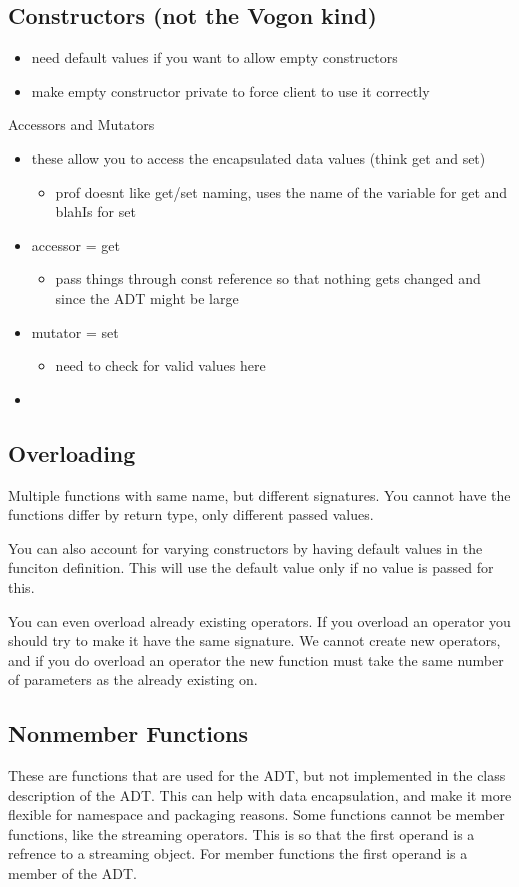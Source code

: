 \documentclass[12pt]{article}
\begin{document}
\subsection*{Constructors (not the Vogon kind)}
\begin{itemize}
\item need default values if you want to allow empty constructors
\item make empty constructor private to force client to use it correctly
\end{itemize}
Accessors and Mutators
\begin{itemize}
\item these allow you to access the encapsulated data values (think get and set)
\begin{itemize}
\item prof doesnt like get/set naming, uses the name of the variable for get and blahIs for set
\end{itemize}
\item accessor = get
\begin{itemize}
\item pass things through const reference so that nothing gets changed and since the ADT might be large
\end{itemize}
\item mutator = set
\begin{itemize}
\item need to check for valid values here
\end{itemize}
\item 
\end{itemize}

\subsection*{Overloading}
Multiple functions with same name, but different signatures. You cannot have the functions differ by return type, only different passed values.

You can also account for varying constructors by having default values in the funciton definition. This will use the default value only if no value is passed for this.

You can even overload already existing operators. If you overload an operator you should try to  make it have the same signature. We cannot create new operators, and if you do overload an operator the new function must take the same number of parameters as the already existing on.

\subsection*{Nonmember Functions}
These are functions that are used for the ADT, but not implemented in the class description of the ADT. This can help with data encapsulation, and make it more flexible for namespace and packaging reasons. Some functions cannot be member functions, like the streaming operators. This is so that the first operand is a refrence to a streaming object. For member functions the first operand is a member of the ADT. 
\end{document}
